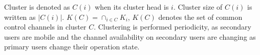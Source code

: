 \documentclass[10pt,journal,compsoc]{IEEEtran}
\theoremstyle{mytheoremstyle}
\theoremstyle{mytheoremstyle}
\theoremstyle{mytheoremstyle}
\newcommand{\ie}{i.e., }
\begin{document}
Cluster is denoted as $C(i)$ when its cluster head is $i$.
Cluster size of $C(i)$ is written as $|C(i)|$.
$ K(C) = \cap_{i\in C} K_i$, $K(C)$ denotes the set of common control channels in cluster $C$.
Clustering is performed periodicity, as secondary users are mobile and the channel availability on secondary users are changing as primary users change their operation state.%











\end{document}
